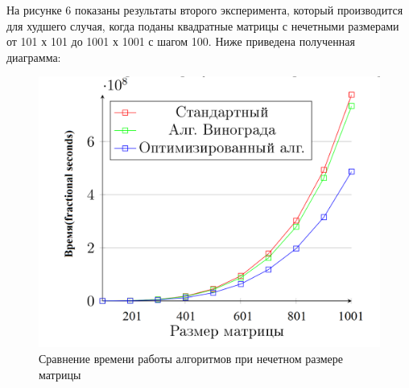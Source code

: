 \documentclass[a4paper, 12pt]{article}
\begin{document}
\begin{flushleft}
	\hspace*{5mm} На рисунке 6 показаны результаты второго эксперимента, который производится для худшего случая, когда поданы квадратные матрицы с нечетными размерами от 101 х 101 до 1001 х 1001 с шагом 100. Ниже приведена полученная диаграмма:
	\clearpage
	\newpage 
	\begin{figure}[h]
		\centering \includegraphics[scale=0.9]{time2}
		\centering\caption{Сравнение времени работы алгоритмов при нечетном размере матрицы}
	\end{figure}
	\clearpage
	\newpage

\end{flushleft}
\end{document}
